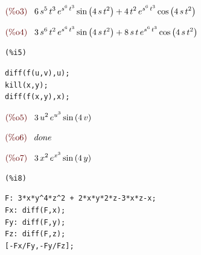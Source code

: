 \documentclass[12pt]{article}
\begin{document}
\begin{math}\displaystyle
\parbox{8ex}{\color{labelcolor}(\%o3) }
6\,{s}^{5}\,{t}^{3}\,{e}^{{s}^{6}\,{t}^{3}}\,\mathrm{sin}\left( 4\,s\,{t}^{2}\right) +4\,{t}^{2}\,{e}^{{s}^{6}\,{t}^{3}}\,\mathrm{cos}\left( 4\,s\,{t}^{2}\right) 
\end{math}

\begin{math}\displaystyle
\parbox{8ex}{\color{labelcolor}(\%o4) }
3\,{s}^{6}\,{t}^{2}\,{e}^{{s}^{6}\,{t}^{3}}\,\mathrm{sin}\left( 4\,s\,{t}^{2}\right) +8\,s\,t\,{e}^{{s}^{6}\,{t}^{3}}\,\mathrm{cos}\left( 4\,s\,{t}^{2}\right) 
\end{math}

\noindent

\begin{minipage}[t]{8ex}{\color{red}\bf
\begin{verbatim}
(%i5) 
\end{verbatim}}
\end{minipage}
\begin{minipage}[t]{\textwidth}{\color{blue}
\begin{verbatim}
diff(f(u,v),u);
kill(x,y);
diff(f(x,y),x);
\end{verbatim}}
\end{minipage}

\begin{math}\displaystyle
\parbox{8ex}{\color{labelcolor}(\%o5) }
3\,{u}^{2}\,{e}^{{u}^{3}}\,\mathrm{sin}\left( 4\,v\right) 
\end{math}

\begin{math}\displaystyle
\parbox{8ex}{\color{labelcolor}(\%o6) }
done
\end{math}

\begin{math}\displaystyle
\parbox{8ex}{\color{labelcolor}(\%o7) }
3\,{x}^{2}\,{e}^{{x}^{3}}\,\mathrm{sin}\left( 4\,y\right) 
\end{math}

\noindent

\begin{minipage}[t]{8ex}{\color{red}\bf
\begin{verbatim}
(%i8) 
\end{verbatim}}
\end{minipage}
\begin{minipage}[t]{\textwidth}{\color{blue}
\begin{verbatim}
F: 3*x*y^4*z^2 + 2*x*y*2*z-3*x*z-x;
Fx: diff(F,x);
Fy: diff(F,y);
Fz: diff(F,z);
[-Fx/Fy,-Fy/Fz];
\end{verbatim}}
\end{minipage}
\end{document}
